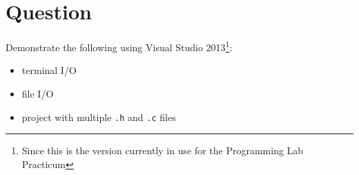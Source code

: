 




\docCopyright

\section{Question}

Demonstrate the following using Visual Studio 2013\footnote{Since this is the
version currently in use for the Programming Lab Practicum}:
\begin{itemize}
  \item terminal I/O
  \item file I/O
  \item project with multiple \texttt{.h} and \texttt{.c}
    files
\end{itemize}



